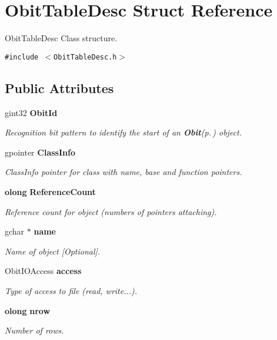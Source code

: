 \section{Obit\-Table\-Desc Struct Reference}
\label{structObitTableDesc}
Obit\-Table\-Desc Class structure.  


{\tt \#include $<$Obit\-Table\-Desc.h$>$}

\subsection*{Public Attributes}
\begin{CompactItemize}
\item 
gint32 {\bf Obit\-Id}
\begin{CompactList}\small\item\em Recognition bit pattern to identify the start of an {\bf Obit}{\rm (p.\,\pageref{structObit})} object. \item\end{CompactList}\item 
gpointer {\bf Class\-Info}
\begin{CompactList}\small\item\em Class\-Info pointer for class with name, base and function pointers. \item\end{CompactList}\item 
{\bf olong} {\bf Reference\-Count}
\begin{CompactList}\small\item\em Reference count for object (numbers of pointers attaching). \item\end{CompactList}\item 
gchar $\ast$ {\bf name}
\begin{CompactList}\small\item\em Name of object [Optional]. \item\end{CompactList}\item 
Obit\-IOAccess {\bf access}
\begin{CompactList}\small\item\em Type of access to file (read, write...). \item\end{CompactList}\item 
{\bf olong} {\bf nrow}
\begin{CompactList}\small\item\em Number of rows. \item\end{CompactList}\item 

\end{CompactItemize}
